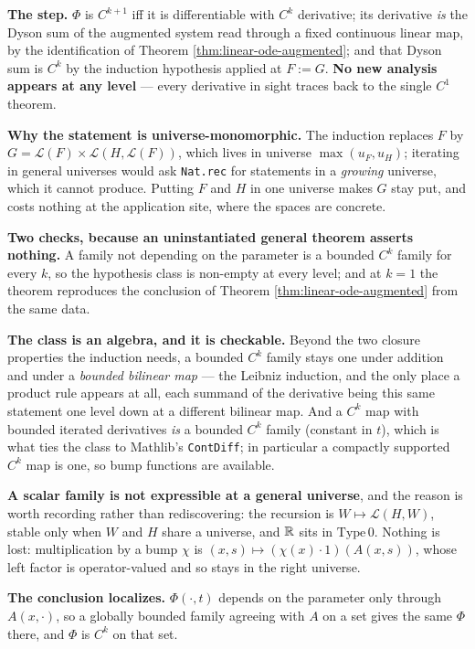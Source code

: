 \begin{theorem}
  \textbf{The step.} $\Phi$ is $C^{k+1}$ iff it is differentiable with $C^k$ derivative; its
  derivative \emph{is} the Dyson sum of the augmented system read through a fixed continuous
  linear map, by the identification of Theorem \ref{thm:linear-ode-augmented}; and that Dyson
  sum is $C^k$ by the induction hypothesis applied at $F := G$. \textbf{No new analysis appears
  at any level} --- every derivative in sight traces back to the single $C^1$ theorem.

  \textbf{Why the statement is universe-monomorphic.} The induction replaces $F$ by
  $G = \mathcal{L}(F) \times \mathcal{L}(H,\mathcal{L}(F))$, which lives in universe
  $\max(u_F,u_H)$; iterating in general universes would ask \texttt{Nat.rec} for statements in a
  \emph{growing} universe, which it cannot produce. Putting $F$ and $H$ in one universe makes
  $G$ stay put, and costs nothing at the application site, where the spaces are concrete.

  \textbf{Two checks, because an uninstantiated general theorem asserts nothing.} A family not
  depending on the parameter is a bounded $C^k$ family for every $k$, so the hypothesis class is
  non-empty at every level; and at $k=1$ the theorem reproduces the conclusion of Theorem
  \ref{thm:linear-ode-augmented} from the same data.

  \textbf{The class is an algebra, and it is checkable.} Beyond the two closure properties the
  induction needs, a bounded $C^k$ family stays one under addition and under a \emph{bounded
  bilinear map} --- the Leibniz induction, and the only place a product rule appears at all,
  each summand of the derivative being this same statement one level down at a different
  bilinear map. And a $C^k$ map with bounded iterated derivatives \emph{is} a bounded $C^k$
  family (constant in $t$), which is what ties the class to Mathlib's \texttt{ContDiff}; in
  particular a compactly supported $C^k$ map is one, so bump functions are available.

  \textbf{A scalar family is not expressible at a general universe}, and the reason is worth
  recording rather than rediscovering: the recursion is $W \mapsto \mathcal{L}(H,W)$, stable
  only when $W$ and $H$ share a universe, and $\mathbb{R}$ sits in $\mathrm{Type}\,0$. Nothing is lost:
  multiplication by a bump $\chi$ is $(x,s) \mapsto (\chi(x)\cdot 1)(A(x,s))$, whose left factor
  is operator-valued and so stays in the right universe.

  \textbf{The conclusion localizes.} $\Phi(\cdot,t)$ depends on the parameter only through
  $A(x,\cdot)$, so a globally bounded family agreeing with $A$ on a set gives the same $\Phi$
  there, and $\Phi$ is $C^k$ on that set.


\end{theorem}
